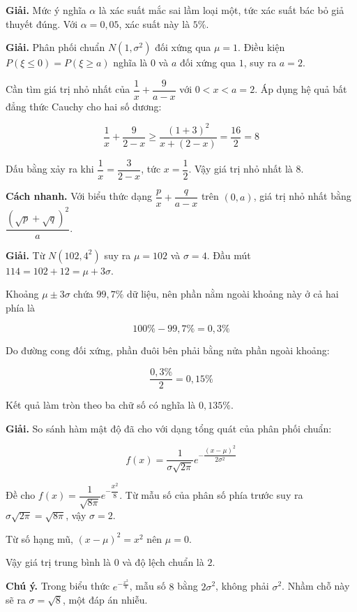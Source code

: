 \documentclass[11pt, a4paper]{article}
\begin{document}
\begin{dapan}[7 — Đáp án B]
\textbf{Giải.} Mức ý nghĩa $\alpha$ là xác suất mắc sai lầm loại một, tức xác suất bác bỏ giả thuyết đúng. Với $\alpha = 0{,}05$, xác suất này là $5\%$.
\end{dapan}

\begin{dapan}[8 — Đáp án B]
\textbf{Giải.} Phân phối chuẩn $N(1, \sigma^2)$ đối xứng qua $\mu = 1$. Điều kiện $P(\xi \le 0) = P(\xi \ge a)$ nghĩa là $0$ và $a$ đối xứng qua $1$, suy ra $a = 2$.

Cần tìm giá trị nhỏ nhất của $\dfrac{1}{x} + \dfrac{9}{a - x}$ với $0 < x < a = 2$. Áp dụng hệ quả bất đẳng thức Cauchy cho hai số dương:

$$\frac{1}{x} + \frac{9}{2-x} \ge \frac{(1 + 3)^2}{x + (2-x)} = \frac{16}{2} = 8$$

Dấu bằng xảy ra khi $\dfrac{1}{x} = \dfrac{3}{2-x}$, tức $x = \dfrac{1}{2}$. Vậy giá trị nhỏ nhất là $8$.

\textbf{Cách nhanh.} Với biểu thức dạng $\dfrac{p}{x} + \dfrac{q}{a-x}$ trên $(0, a)$, giá trị nhỏ nhất bằng $\dfrac{(\sqrt{p} + \sqrt{q})^2}{a}$.
\end{dapan}

\begin{dapan}[9 — Đáp án C]
\textbf{Giải.} Từ $N(102, 4^2)$ suy ra $\mu = 102$ và $\sigma = 4$. Đầu mút $114 = 102 + 12 = \mu + 3\sigma$.

Khoảng $\mu \pm 3\sigma$ chứa $99{,}7\%$ dữ liệu, nên phần nằm ngoài khoảng này ở cả hai phía là

$$100\% - 99{,}7\% = 0{,}3\%$$

Do đường cong đối xứng, phần đuôi bên phải bằng nửa phần ngoài khoảng:

$$\frac{0{,}3\%}{2} = 0{,}15\%$$

Kết quả làm tròn theo ba chữ số có nghĩa là $0{,}135\%$.
\end{dapan}

\begin{dapan}[10 — Đáp án C]
\textbf{Giải.} So sánh hàm mật độ đã cho với dạng tổng quát của phân phối chuẩn:

$$f(x) = \frac{1}{\sigma\sqrt{2\pi}} e^{-\dfrac{(x-\mu)^2}{2\sigma^2}}$$

Đề cho $f(x) = \dfrac{1}{\sqrt{8\pi}} e^{-\dfrac{x^2}{8}}$. Từ mẫu số của phân số phía trước suy ra $\sigma\sqrt{2\pi} = \sqrt{8\pi}$, vậy $\sigma = 2$.

Từ số hạng mũ, $(x - \mu)^2 = x^2$ nên $\mu = 0$.

Vậy giá trị trung bình là $0$ và độ lệch chuẩn là $2$.

\textbf{Chú ý.} Trong biểu thức $e^{-\frac{x^2}{8}}$, mẫu số $8$ bằng $2\sigma^2$, không phải $\sigma^2$. Nhầm chỗ này sẽ ra $\sigma = \sqrt{8}$, một đáp án nhiễu.
\end{dapan}
\end{document}
